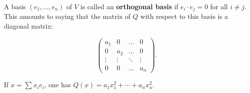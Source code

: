 A basis $(e_1, \dots, e_n)$ of $V$ is called an \textbf{orthogonal basis} if $e_i \cdot e_j = 0$ for all $i \neq j$. This amounts to saying that the matrix of $Q$ with respect to this basis is a diagonal matrix:

$$\begin{pmatrix}
a_1 & 0 & \dots & 0 \\
0 & a_2 & \dots & 0 \\
\vdots & \vdots & \ddots & \vdots \\
0 & 0 & \dots & a_n
\end{pmatrix}.$$

If $x = \sum x_i e_i$, one has $Q(x) = a_1 x_1^2 + \cdots + a_n x_n^2$.
